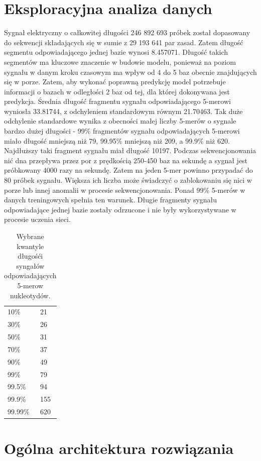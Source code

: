 \documentclass[a4paper,11pt,twoside]{report}
\theoremstyle{definition}
\begin{document}
\section*{Eksploracyjna analiza danych}

Sygnał elektryczny o całkowitej długości 246 892 693 próbek został dopasowany do sekwencji składających się w sumie z 29 193 641 par zasad. Zatem długość segmentu odpowiadającego jednej bazie wynosi 8.457071. Długość takich segmentów ma kluczowe znaczenie w budowie modelu, ponieważ na poziom sygnału w danym kroku czasowym ma wpływ od 4 do 5 baz obecnie znajdujących się w porze. Zatem, aby wykonać poprawną predykcję model potrzebuje informacji o bazach w odległości 2 baz od tej, dla której dokonywana jest predykcja. Średnia długość fragmentu sygnału odpowiadającego 5-merowi wyniosła 33.81744, z odchyleniem standardowym równym 21.70463. Tak duże odchylenie standardowe wynika z obecności małej liczby 5-merów o sygnale bardzo dużej długości - 99\% fragmentów sygnału odpowiadających 5-merowi miało długość mniejszą niż 79, 99.95\% mniejszą niż 209, a 99.9\% niż 620. Najdłuższy taki fragment sygnału miał długość 10197. Podczas sekwencjonowania nić dna przepływa przez por z prędkością 250-450 baz na sekundę a sygnał jest próbkowany 4000 razy na sekundę. Zatem na jeden 5-mer powinno przypadać do 80 próbek sygnału. Większa ich liczba może świadczyć o zablokowaniu się nici w porze lub innej anomalii w procesie sekwencjonowania. Ponad 99\% 5-merów w danych treningowych spełnia ten warunek. Długie fragmenty sygnału odpowiadające jednej bazie zostały odrzucone i nie były wykorzystywane w procesie uczenia sieci.

\begin{table}[]
	\centering
	\begin{tabular}{ll}
		10\%    & 21  \\
		30\%    & 26  \\
		50\%    & 31  \\
		70\%    & 37  \\
		90\%    & 49  \\
		99\%    & 79  \\
		99.5\%  & 94  \\
		99.9\%  & 155 \\
		99.99\% & 620
	\end{tabular}
	\caption{\label{}Wybrane kwantyle długośći syngałów odpowiadających 5-merow nukleotydów.}
\end{table}

\section{Ogólna architektura rozwiązania}
\end{document}
